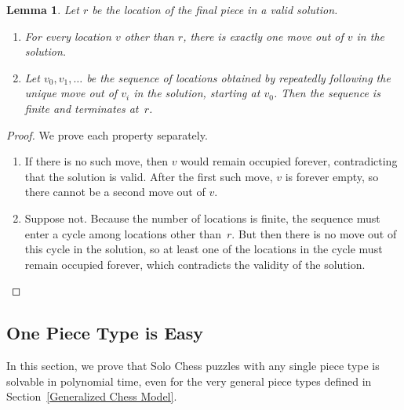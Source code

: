 \documentclass[11pt,letterpaper]{article}
\theoremstyle{plain}
\newtheorem{lemma}[theorem]{Lemma}
\theoremstyle{definition}
\theoremstyle{remark}
\numberwithin{equation}{section}
\begin{document}
\begin{lemma}
  \label{lem:solution-no-cycle}
  Let $r$ be the location of the final piece in a valid solution.
  \begin{enumerate}
  \item For every location $v$ other than $r$, there is exactly one move out of $v$ in the solution.
  \item
    Let $v_0, v_1, \dots$ be the sequence of locations obtained by repeatedly following the unique move out of $v_i$ in the solution, starting at $v_0$.
    Then the sequence is finite and terminates at~$r$.
  \end{enumerate}
\end{lemma}
\begin{proof}
  We prove each property separately.
  \begin{enumerate}
  \item If there is no such move, then $v$ would remain occupied forever,
    contradicting that the solution is valid.
    After the first such move, $v$ is forever empty,
    so there cannot be a second move out of $v$.
  \item
    Suppose not.
    Because the number of locations is finite,
    the sequence must enter a cycle among locations other than~$r$.
    But then there is no move out of this cycle in the solution,
    so at least one of the locations in the cycle must remain occupied forever,
    which contradicts the validity of the solution.
    \qedhere
  \end{enumerate}
\end{proof}

\subsection{One Piece Type is Easy}
\label{sec:onepieceeasy}

In this section, we prove that Solo Chess puzzles with any single piece type
is solvable in polynomial time, even for the very general piece types
defined in Section~\ref{Generalized Chess Model}.
\end{document}
